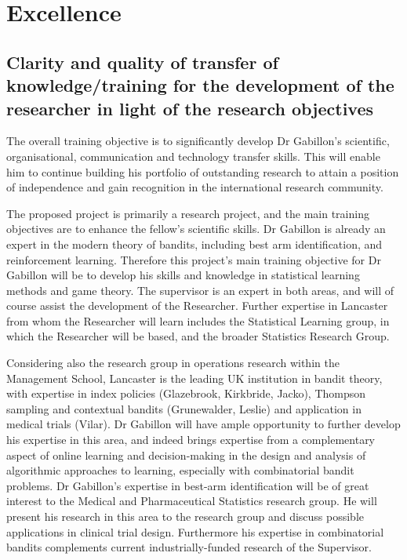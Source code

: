 \documentclass[a4paper,11pt]{article}
\renewcommand{\cite}{\autocite} %
\begin{document}
\newpage

\section{Excellence}
\label{sec:excellence}






\subsection{Clarity and quality of transfer of knowledge/training for the development of the researcher in light of the research objectives}
\label{sec:transfer}


The overall training objective is to significantly develop Dr Gabillon's scientific, organisational, communication and technology transfer skills.  This will enable him to continue building his portfolio of outstanding research to attain a position of independence and gain recognition in the international research community.

The proposed project is primarily a research project, and the main training objectives are to enhance the fellow's scientific skills. Dr Gabillon is already an expert in the modern theory of bandits, including best arm identification, and reinforcement learning.  Therefore this project's main training objective for Dr Gabillon will be to develop his skills and knowledge in statistical learning methods and game theory.  The supervisor is an expert in both areas, and will of course assist the development of the Researcher.  Further expertise in Lancaster from whom the Researcher will learn includes the Statistical Learning group, in which the Researcher will be based, and the broader Statistics Research Group.

Considering also the research group in operations research within the Management School, Lancaster is the leading UK institution in bandit theory, with expertise in index policies (Glazebrook, Kirkbride, Jacko), Thompson sampling and contextual bandits (Grunewalder, Leslie) and application in medical trials (Vilar). Dr Gabillon will have ample opportunity to further develop his expertise in this area, and indeed brings expertise from a complementary aspect of online learning and decision-making in the design and analysis of algorithmic approaches to learning, especially with combinatorial bandit problems.   Dr Gabillon's expertise in best-arm identification will be of great interest to the Medical and Pharmaceutical Statistics research group.  He will present his research in this area to the research group and discuss possible applications in clinical trial design.  Furthermore his expertise in combinatorial bandits complements current industrially-funded research of the Supervisor.
\end{document}

